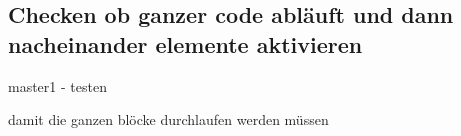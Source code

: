 \subsection{Checken ob ganzer code abläuft und dann nacheinander elemente aktivieren}\label{subsection:counter-modifications-flow}
master1 - testen\newline

damit die ganzen blöcke durchlaufen werden müssen
